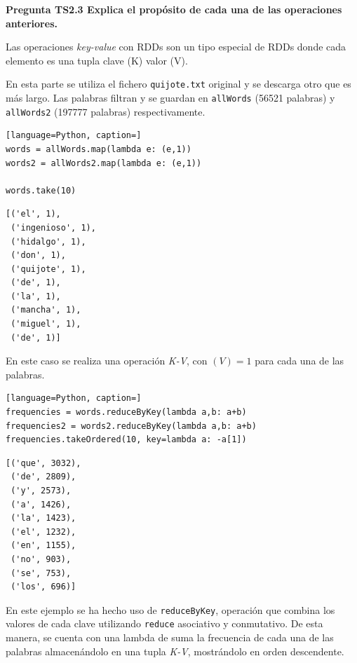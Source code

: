 \documentclass[10pt,swedish, openany]{book}
\begin{document}
\vspace{0.8em}

\textbf{Pregunta TS2.3 Explica el propósito de cada una de las operaciones anteriores.}

Las operaciones \textit{key-value} con RDDs son un tipo especial de RDDs donde cada elemento es una tupla clave (K) valor (V). 

En esta parte se utiliza el fichero \texttt{quijote.txt} original y se descarga otro que es más largo. Las palabras filtran y se guardan en \texttt{allWords} (56521 palabras) y \texttt{allWords2} (197777 palabras) respectivamente.

\begin{lstlisting}[language=Python, caption=]
words = allWords.map(lambda e: (e,1))
words2 = allWords2.map(lambda e: (e,1))

words.take(10)
\end{lstlisting}
\begin{verbatim}
[('el', 1),
 ('ingenioso', 1),
 ('hidalgo', 1),
 ('don', 1),
 ('quijote', 1),
 ('de', 1),
 ('la', 1),
 ('mancha', 1),
 ('miguel', 1),
 ('de', 1)]
\end{verbatim}

En este caso se realiza una operación \textit{K-V}, con $(V)=1$ para cada una de las palabras.

\begin{lstlisting}[language=Python, caption=]
frequencies = words.reduceByKey(lambda a,b: a+b)
frequencies2 = words2.reduceByKey(lambda a,b: a+b)
frequencies.takeOrdered(10, key=lambda a: -a[1])
\end{lstlisting}
\begin{verbatim}
[('que', 3032),
 ('de', 2809),
 ('y', 2573),
 ('a', 1426),
 ('la', 1423),
 ('el', 1232),
 ('en', 1155),
 ('no', 903),
 ('se', 753),
 ('los', 696)]
\end{verbatim}

En este ejemplo se ha hecho uso de \texttt{reduceByKey}, operación que combina los valores de cada clave utilizando \texttt{reduce} asociativo y conmutativo. De esta manera, se cuenta con una lambda de suma la frecuencia de cada una de las palabras almacenándolo en una tupla \textit{K-V}, mostrándolo en orden descendente. 


\end{document}
